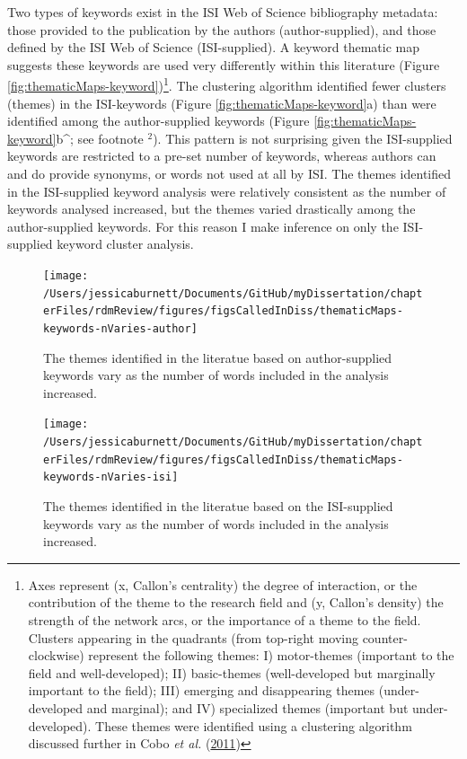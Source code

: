\documentclass[12pt,twoside,openany]{reedthesis}
\begin{document}
Two types of keywords exist in the ISI Web of Science bibliography metadata: those provided to the publication by the authors (author-supplied), and those defined by the ISI Web of Science (ISI-supplied). A keyword thematic map suggests these keywords are used very differently within this literature (Figure \ref{fig:thematicMaps-keyword})\footnote{Axes represent (x, Callon's centrality) the degree of interaction, or the contribution of the theme to the research field and (y, Callon's density) the strength of the network arcs, or the importance of a theme to the field. Clusters appearing in the quadrants (from top-right moving counter-clockwise) represent the following themes: I) motor-themes (important to the field and well-developed); II) basic-themes (well-developed but marginally important to the field); III) emerging and disappearing themes (under-developed and marginal); and IV) specialized themes (important but under-developed). These themes were identified using a clustering algorithm discussed further in Cobo \emph{et al.} (\protect\hyperlink{ref-cobo2011approach}{2011})}. The clustering algorithm identified fewer clusters (themes) in the ISI-keywords (Figure \ref{fig:thematicMaps-keyword}a) than were identified among the author-supplied keywords (Figure \ref{fig:thematicMaps-keyword}b\^{}; see footnote \(^2\)). This pattern is not surprising given the ISI-supplied keywords are restricted to a pre-set number of keywords, whereas authors can and do provide synonyms, or words not used at all by ISI. The themes identified in the ISI-supplied keyword analysis were relatively consistent as the number of keywords analysed increased, but the themes varied drastically among the author-supplied keywords. For this reason I make inference on only the ISI-supplied keyword cluster analysis.
\begin{figure}[bth]

{\centering \texttt{[image: /Users/jessicaburnett/Documents/GitHub/myDissertation/chapterFiles/rdmReview/figures/figsCalledInDiss/thematicMaps-keywords-nVaries-author]} 

}

\caption{The themes identified in the literatue based on author-supplied keywords vary as the number of words included in the analysis increased.}\label{fig:thematicMaps-keyword-author}
\end{figure}
\begin{figure}[bth]

{\centering \texttt{[image: /Users/jessicaburnett/Documents/GitHub/myDissertation/chapterFiles/rdmReview/figures/figsCalledInDiss/thematicMaps-keywords-nVaries-isi]} 

}

\caption{The themes identified in the literatue based on the ISI-supplied keywords vary as the number of words included in the analysis increased.}\label{fig:thematicMaps-keyword-isi}
\end{figure}
\end{document}
